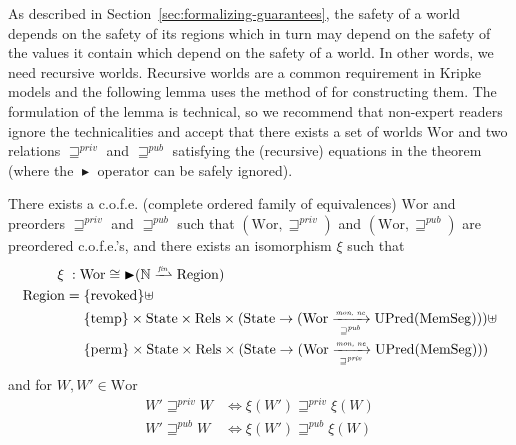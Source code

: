 \documentclass[acmsmall,review]{acmart}\settopmatter{printfolios=true}
\newcommand{\finparfun}{\xrightharpoonup{\textit{\tiny{fin}}}}
\newcommand{\fun}{\rightarrow}
\newcommand{\blater}{\mathop{\blacktriangleright}}
\newcommand{\cofe}{c.o.f.e.}
\newcommand{\cofes}{\cofe{}'s}
\newcommand\lau[1]{{\color{purple} \sf \footnotesize {LS: #1}}\\}
\newcommand\dominique[1]{{\color{purple} \sf \footnotesize {DD: #1}}\\}
\newcommand{\var}[1]{\mathit{#1}}
\newcommand{\futurewk}{\mathbin{\sqsupseteq}^{\var{pub}}}
\newcommand{\futurestr}{\mathbin{\sqsupseteq}^{\var{priv}}}
\newcommand{\monwknefun}{\xrightarrow[\text{\tiny{$\futurewk$}}]{\textit{\tiny{mon, ne}}}}
\newcommand{\monstrnefun}{\xrightarrow[\text{\tiny{$\futurestr$}}]{\textit{\tiny{mon, ne}}}}
\newcommand{\plaindom}[1]{\mathrm{#1}}
\newcommand{\HeapSegments}{\plaindom{MemSeg}}
\newcommand{\nats}{\mathbb{N}}
\newcommand{\Rels}{\plaindom{Rels}}
\newcommand{\States}{\plaindom{State}}
\newcommand{\Regions}{\plaindom{Region}}
\newcommand{\Wor}{\plaindom{Wor}}
\newcommand{\UPred}[1]{\plaindom{UPred}(#1)}
\newcommand{\plainview}[1]{\mathrm{#1}}
\newcommand{\perma}{\plainview{perm}}
\newcommand{\temp}{\plainview{temp}}
\newcommand{\revoked}{\plainview{revoked}}
\begin{document}
As described in Section~\ref{sec:formalizing-guarantees}, the safety of a world
depends on the safety of its regions which in turn may depend on the safety of
the values it contain which depend on the safety of a world. In other words, we
need recursive worlds. Recursive worlds are a common requirement in Kripke
models and the following lemma uses the method of
\citet{Birkedal:2011:SKM:1926385.1926401,Birkedal:tutorial-notes} for
constructing them. The formulation of the lemma is technical, so we recommend
that non-expert readers ignore the technicalities and accept that there exists a
set of worlds $\Wor$ and two relations $\futurestr$ and $\futurewk$ satisfying
the (recursive) equations in the theorem (where the $\blater$ operator can be
safely ignored).
\begin{theorem}\label{thm:world-existence}
  There exists a \cofe{} (complete ordered family of equivalences) $\Wor$ and preorders $\futurestr$ and
  $\futurewk$ such that $(\Wor,\futurestr)$ and $(\Wor,\futurewk)$ are
  preordered \cofes{}, and there exists an isomorphism $\xi$ such that
  \begin{align*}
      \xi \; : \; & \Wor \cong \blater (\nats \finparfun \Regions)\\
      \Regions  = & \; \{\revoked\} \uplus \\
               & \; \{\temp\} \times \States \times \Rels \times (\States \fun (\Wor \monwknefun \UPred{\HeapSegments}))\uplus \\
               & \; \{\perma\} \times \States \times \Rels \times (\States \fun (\Wor \monstrnefun \UPred{\HeapSegments}))
    \end{align*}
  and for $W, W' \in \Wor$
  \begin{align*}
    W' \futurestr W & \Leftrightarrow \xi(W') \futurestr \xi(W)   \\
    W' \futurewk W & \Leftrightarrow \xi(W') \futurewk \xi(W)
  \end{align*}
\end{theorem}
\end{document}
